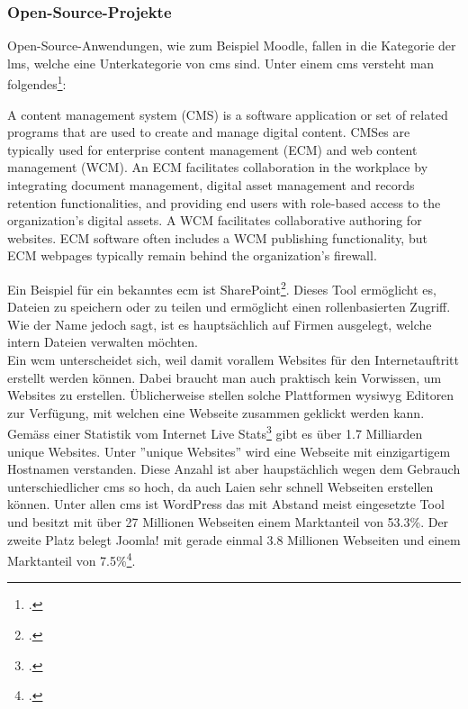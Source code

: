 \subsubsection*{Open-Source-Projekte}
Open-Source-Anwendungen, wie zum Beispiel Moodle, fallen in die Kategorie der \gls{lms}, welche eine Unterkategorie von \gls{cms} sind. Unter einem \gls{cms} versteht man folgendes\footcite{cms_definition}:

\begin{displayquote}
A content management system (CMS) is a software application or set of related programs that are used to create and manage digital content. CMSes are typically used for enterprise content management (ECM) and web content management (WCM). An ECM facilitates collaboration in the workplace by integrating document management, digital asset management and records retention functionalities, and providing end users with role-based access to the organization's digital assets. A WCM facilitates collaborative authoring for websites. ECM software often includes a WCM publishing functionality, but ECM webpages typically remain behind the organization's firewall.  
\end{displayquote}

Ein Beispiel für ein bekanntes \gls{ecm} ist SharePoint\footcite{sharepoint}. Dieses Tool ermöglicht es, Dateien zu speichern oder zu teilen und ermöglicht einen rollenbasierten Zugriff. Wie der Name jedoch sagt, ist es hauptsächlich auf Firmen ausgelegt, welche intern Dateien verwalten möchten. \\

Ein \gls{wcm} unterscheidet sich, weil damit vorallem Websites für den Internetauftritt erstellt werden können. Dabei braucht man auch praktisch kein Vorwissen, um Websites zu erstellen. Üblicherweise stellen solche Plattformen \gls{wysiwyg} Editoren zur Verfügung, mit welchen eine Webseite zusammen geklickt werden kann. Gemäss einer Statistik vom Internet Live Stats\footcite{internet_live_stats} gibt es über 1.7 Milliarden unique Websites. Unter ''unique Websites'' wird eine Webseite mit einzigartigem Hostnamen verstanden. Diese Anzahl ist aber haupstächlich wegen dem Gebrauch unterschiedlicher \gls{cms} so hoch, da auch Laien sehr schnell Webseiten erstellen können. Unter allen \gls{cms} ist WordPress das mit Abstand meist eingesetzte Tool und besitzt mit über 27 Millionen Webseiten einem Marktanteil von 53.3\%. Der zweite Platz belegt Joomla! mit gerade einmal 3.8 Millionen Webseiten und einem Marktanteil von 7.5\%\footcite{cms_market_share}.\\

